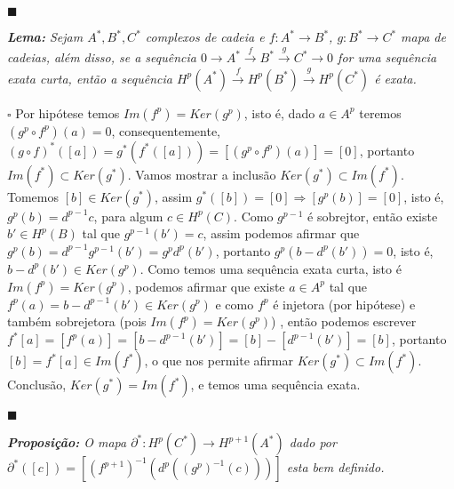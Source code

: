 \documentclass{article}
\begin{document}
	$\blacksquare$
	
	\vspace{2mm}
	\textit{\textbf{Lema:} Sejam $A^{*}, B^{*}, C^{*}$ complexos de cadeia e $f:A^{*} \to B^{*}$, $g:B^{*} \to C^{*}$ mapa de cadeias, além disso, se a sequência $0 \to A^{*} \xrightarrow{f} B^{*} \xrightarrow{g} C^{*} \to 0$ for uma sequência exata curta, então a sequência $H^{p}(A^{*}) \xrightarrow{f} H^{p}(B^{*}) \xrightarrow{g} H^{p}(C^{*}) $ é exata.}
	
	$\square$ Por hipótese temos $Im(f^{p}) = Ker(g^{p})$, isto é, dado $a \in A^{p}$ teremos $(g^{p}\circ f^{p})(a) = 0$, consequentemente, $(g\circ f)^{*}([a]) = g^{*}(f^{*}([a])) = [(g^{p}\circ f^{p})(a)] = [0]$, portanto $Im(f^{*}) \subset Ker(g^{*})$. Vamos mostrar a inclusão $Ker(g^{*}) \subset Im(f^{*})$. Tomemos $[b] \in Ker(g^{*})$, assim $g^{*}([b]) = [0] \Rightarrow [g^{p}(b)] = [0]$, isto é, $g^{p}(b) = d^{p-1}c$, para algum $c \in H^{p}(C)$. Como $g^{p-1}$ é sobrejtor, então existe $b' \in H^{p}(B)$ tal que $g^{p-1}(b') = c$, assim podemos afirmar que $g^{p}(b) = d^{p-1}g^{p-1}(b') = g^{p}d^{p}(b')$, portanto $g^{p}(b - d^{p}(b')) = 0$, isto é, $b - d^{p}(b') \in Ker(g^{p})$. Como temos uma sequência exata curta, isto é $Im(f^{p}) = Ker(g^{p})$, podemos afirmar que existe $a \in A^{p}$ tal que $f^{p}(a) = b - d^{p-1}(b') \in Ker(g^{p})$ e como $f^{p}$ é injetora (por hipótese) e também sobrejetora (pois $Im(f^{p}) = Ker(g^{p})$) , então podemos escrever $f^{*}[a] = [f^{p}(a)] = [b - d^{p-1}(b')] =  [b] - [d^{p-1}(b')] = [b]$, portanto $[b] = f^{*}[a] \in Im(f^{*})$, o que nos permite afirmar $Ker(g^{*}) \subset Im(f^{*})$. Conclusão, $Ker(g^{*}) = Im(f^{*})$, e temos uma sequência exata. 
	
	$\blacksquare$
	
	\vspace{2mm}
	\textit{\textbf{Proposição:} O mapa $\partial^{*}: H^{p}(C^{*}) \to H^{p+1}(A^{*})$ dado por $\partial^{*}([c]) = [(f^{p+1})^{-1}(d^{p}((g^{p})^{-1}(c)))] $ esta bem definido.}
	
\end{document}
